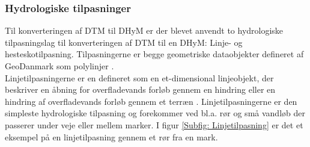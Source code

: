 \subsubsection{Hydrologiske tilpasninger} \label{Afsnit: Hydrologiske tilpasninger}
Til konverteringen af DTM til DHyM er der blevet anvendt to hydrologiske tilpasningslag til konverteringen af DTM til en DHyM: Linje- og hesteskotilpasning. Tilpasningerne er begge geometriske dataobjekter defineret af GeoDanmark som polylinjer \citep{GeoDanmark_HydroLag}. \\
Linjetilpasningerne er en defineret som en et-dimensional linjeobjekt, der beskriver en åbning for overfladevands forløb gennem en hindring eller en hindring af overfladevands forløb gennem et terræn \citep{DHMLinje}. 
Linjetilpasningerne er den simpleste hydrologiske tilpasning og forekommer ved bl.a. rør og små vandløb der passerer under veje eller mellem marker. I figur \ref{Subfig: Linjetilpasning} er det et eksempel på en linjetilpasning gennem et rør fra en mark.\\

